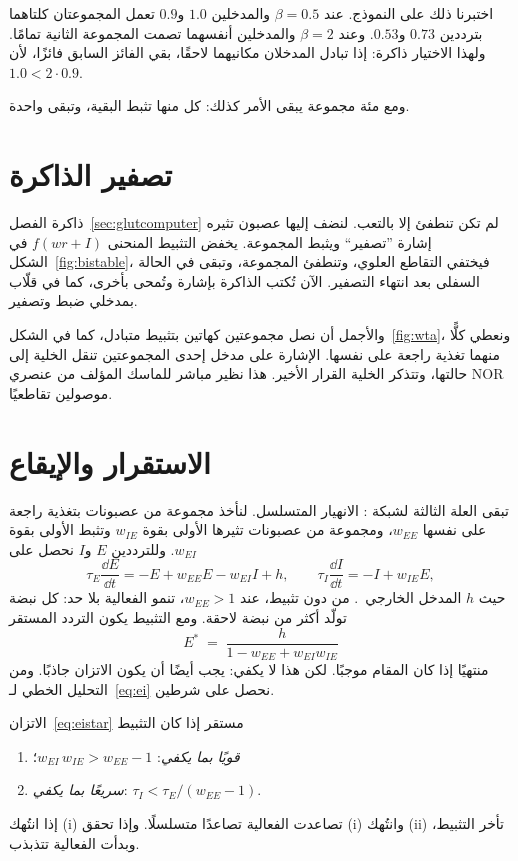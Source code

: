 اختبرنا ذلك على النموذج. عند $\beta=0.5$ والمدخلين $1.0$ و$0.9$ تعمل المجموعتان كلتاهما بترددين $0.73$ و$0.53$. وعند $\beta=2$ والمدخلين أنفسهما تصمت المجموعة الثانية تمامًا. ولهذا الاختيار ذاكرة: إذا تبادل المدخلان مكانيهما لاحقًا، بقي الفائز السابق فائزًا، لأن $1.0<2\cdot0.9$.

ومع مئة مجموعة يبقى الأمر كذلك: كل منها تثبط البقية، وتبقى واحدة.

\section{تصفير الذاكرة}

ذاكرة الفصل~\ref{sec:glutcomputer} لم تكن تنطفئ إلا بالتعب. لنضف إليها عصبون  تثيره إشارة ”تصفير“ ويثبط المجموعة. يخفض التثبيط المنحنى $f(wr+I)$ في الشكل~\ref{fig:bistable}، فيختفي التقاطع العلوي، وتنطفئ المجموعة، وتبقى في الحالة السفلى بعد انتهاء التصفير. الآن تُكتب الذاكرة بإشارة وتُمحى بأخرى، كما في قلّاب بمدخلي ضبط وتصفير.

والأجمل أن نصل مجموعتين كهاتين بتثبيط متبادل، كما في الشكل~\ref{fig:wta}، ونعطي كلًّا منهما تغذية راجعة على نفسها. الإشارة على مدخل إحدى المجموعتين تنقل الخلية إلى حالتها، وتتذكر الخلية القرار الأخير. هذا نظير مباشر للماسك المؤلف من عنصري \foreignlanguage{english}{NOR} موصولين تقاطعيًا.

\section{الاستقرار والإيقاع}

تبقى العلة الثالثة لشبكة : الانهيار المتسلسل. لنأخذ مجموعة من عصبونات  بتغذية راجعة على نفسها $w_{EE}$، ومجموعة من عصبونات  تثيرها الأولى بقوة $w_{IE}$ وتثبط الأولى بقوة $w_{EI}$. وللترددين $E$ و$I$ نحصل على
\begin{equation}
\tau_E\frac{\dd E}{\dd t} = -E + w_{EE}E - w_{EI}I + h, \qquad
\tau_I\frac{\dd I}{\dd t} = -I + w_{IE}E ,
\label{eq:ei}
\end{equation}
حيث $h$ المدخل الخارجي~\cite{WilsonCowan1972}. من دون تثبيط، عند $w_{EE}>1$، تنمو الفعالية بلا حد: كل نبضة تولّد أكثر من نبضة لاحقة. ومع التثبيط يكون التردد المستقر
\begin{equation}
E^* \;=\; \frac{h}{1-w_{EE}+w_{EI}w_{IE}}
\label{eq:eistar}
\end{equation}
منتهيًا إذا كان المقام موجبًا. لكن هذا لا يكفي: يجب أيضًا أن يكون الاتزان جاذبًا. ومن التحليل الخطي لـ~\eqref{eq:ei} نحصل على شرطين.

\begin{keyblock}
\begin{proposition}
\label{prop:ei}
الاتزان~\eqref{eq:eistar} مستقر إذا كان التثبيط
\begin{enumerate}
\item[(i)] \emph{قويًا بما يكفي}: $w_{EI}\,w_{IE} > w_{EE}-1$؛
\item[(ii)] \emph{سريعًا بما يكفي}: $\tau_I < \tau_E/(w_{EE}-1)$.
\end{enumerate}
إذا انتُهك (i) تصاعدت الفعالية تصاعدًا متسلسلًا. وإذا تحقق (i) وانتُهك (ii) تأخر التثبيط، وبدأت الفعالية تتذبذب.
\end{proposition}
\end{keyblock}

